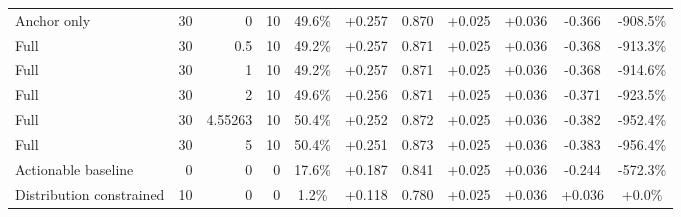 \begin{table}[htbp]
\begin{tabular}{lrrrccccccc}
Anchor only & 30 & 0 & 10 & 49.6\% & +0.257 & 0.870 & +0.025 & +0.036 & -0.366 & -908.5\% \\
Full & 30 & 0.5 & 10 & 49.2\% & +0.257 & 0.871 & +0.025 & +0.036 & -0.368 & -913.3\% \\
Full & 30 & 1 & 10 & 49.2\% & +0.257 & 0.871 & +0.025 & +0.036 & -0.368 & -914.6\% \\
Full & 30 & 2 & 10 & 49.6\% & +0.256 & 0.871 & +0.025 & +0.036 & -0.371 & -923.5\% \\
Full & 30 & 4.55263 & 10 & 50.4\% & +0.252 & 0.872 & +0.025 & +0.036 & -0.382 & -952.4\% \\
Full & 30 & 5 & 10 & 50.4\% & +0.251 & 0.873 & +0.025 & +0.036 & -0.383 & -956.4\% \\
Actionable baseline & 0 & 0 & 0 & 17.6\% & +0.187 & 0.841 & +0.025 & +0.036 & -0.244 & -572.3\% \\
Distribution constrained & 10 & 0 & 0 & 1.2\% & +0.118 & 0.780 & +0.025 & +0.036 & +0.036 & +0.0\% \\
\bottomrule
\end{tabular}
\end{table}